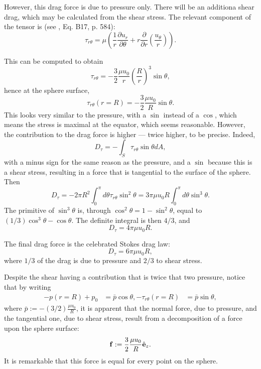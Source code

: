 However, this drag force is due to pressure only. There will be an
additiona shear drag, which may be calculated from the shear stress.
The relevant component of the tensor is (see \cite{white1991viscous},
Eq. B17, p. 584):
\[
  \tau_{r\theta} = \mu \left(
    \frac1r
    \frac{\partial u_r}{\partial \theta} +
    r \frac{\partial }{\partial r} \left( \frac{u_\theta}{r}\right) 
  \right) .
\]

This can be computed to obtain
\[
  \tau_{r\theta} = 
  - \frac32 \frac{\mu u_0}{r} \left(\frac{R}{r}\right)^3 \sin\theta ,
\]
hence at the sphere surface,
\[
  \tau_{r\theta} (r=R) =  - \frac32 \frac{\mu u_0}{R}  \sin\theta .
\]
This looks very similar to the pressure, with a $\sin$ instead of a
$\cos$, which means the stress is maximal at the equator, which seems
reasonable. However, the contribution to the drag force is higher ---
twice higher, to be precise. Indeed,
\[
  D_\tau =  - \int_S  \tau_{r\theta} \sin\theta dA ,
\]
with a minus sign for the same reason as the pressure, and a $\sin$
because this is a shear stress, resulting in a force that is
tangential to the surface of the sphere.  Then
\[
  D_\tau =
  - 2\pi R^2 \int_0^\pi d\theta   \tau_{r\theta} \sin^2\theta  =
  3 \pi \mu u_0 R  \int_0^\pi d\theta \sin^3\theta .
\]
The primitive of $\sin^3\theta$ is, through
$\cos^2\theta=1-\sin^2\theta$, equal to
$(1/3) \cos^3\theta - \cos\theta$. The definite integral is then $4/3$, and
\[
  D_\tau = 4 \pi \mu u_0 R .
\]

The final drag force is the celebrated Stokes drag law: 
\[
  D_\tau = 6 \pi \mu u_0 R ,
\]
where $1/3$ of the drag is due to pressure and $2/3$ to shear stress.

Despite the shear having a contribution that is twice that two
pressure, notice that by writing 
\begin{align*}
  - p(r=R) + p_0 &= \bar{p} \cos\theta,  
  -\tau_{r\theta} (r=R) &= \bar{p} \sin\theta,  
\end{align*}
where $\bar{p} := - (3/2) \frac{\mu u_0}{R}$, it is apparent that the
normal force, due to pressure, and the tangential one, due to shear
stress, result from a decomposition of a force upon the sphere surface:
\[
  \mathbf{f} := \frac32 \frac{\mu u_0}{R} \hat{\mathbf{e}}_z .
\]
It is remarkable that this force is equal for every point on the
sphere.





